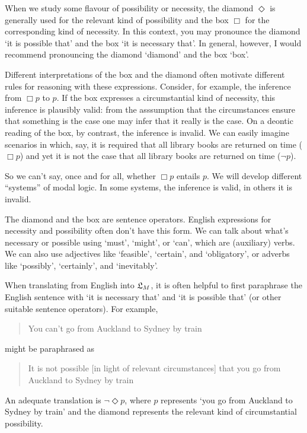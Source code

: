 
When we study some flavour of possibility or necessity, the diamond $\Diamond$
is generally used for the relevant kind of possibility and the box $\Box$ for
the corresponding kind of necessity. In this context, you may pronounce the
diamond `it is possible that' and the box `it is necessary that'. In general,
however, I would recommend pronouncing the diamond `diamond' and the box `box'.


Different interpretations of the box and the diamond often motivate different
rules for reasoning with these expressions. Consider, for example, the inference
from $\Box p$ to $p$. If the box expresses a circumstantial kind of necessity,
this inference is plausibly valid: from the asssumption that the circumstances ensure that
something is the case one may infer that it really is the case. On a deontic reading of the
box, by contrast, the inference is invalid. We can easily imagine scenarios in
which, say, it is required that all library books are returned on time
($\Box p$) and yet it is not the case that all library books are returned on
time ($\neg p$).

So we can't say, once and for all, whether $\Box p$ entails $p$. We will develop
different ``systems'' of modal logic. In some systems, the inference is
valid, in others it is invalid.


The diamond and the box are sentence operators. English expressions for
necessity and possibility often don't have this form. We can talk about what's
necessary or possible using `must', `might', or `can', which are (auxiliary)
verbs. We can also use adjectives like `feasible', `certain', and `obligatory',
or adverbs like `possibly', `certainly', and `inevitably'.


When translating from English into $\mathfrak{L}_{M}$, it is often helpful to first
paraphrase the English sentence with `it is necessary that' and `it is possible
that' (or other suitable sentence operators). For example,
\begin{quote}
  You can't go from Auckland to Sydney by train
\end{quote}
might be paraphrased as
\begin{quote}
  It is not possible [in light of relevant circumstances] that you go from
  Auckland to Sydney by train
\end{quote}
An adequate translation is $\neg\Diamond p$, where $p$ represents `you go from
Auckland to Sydney by train' and the diamond represents the relevant kind of
circumstantial possibility.

